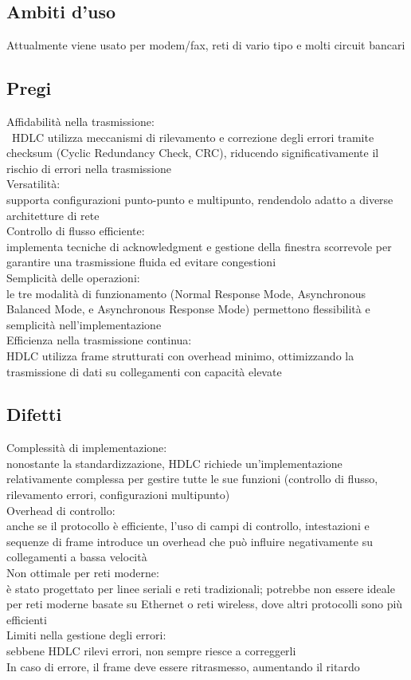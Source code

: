 \documentclass[10pt,oneside,a4paper]{article}
\begin{document}
\subsection{Ambiti d'uso}
Attualmente viene usato per modem/fax, reti di vario tipo e molti circuit bancari
\subsection{Pregi}
Affidabilità nella trasmissione:\\\
HDLC utilizza meccanismi di rilevamento e correzione degli errori tramite checksum (Cyclic Redundancy Check, CRC), riducendo significativamente il rischio di errori nella trasmissione\\
Versatilità:\\
supporta configurazioni punto-punto e multipunto, rendendolo adatto a diverse architetture di rete\\
Controllo di flusso efficiente:\\
implementa tecniche di acknowledgment e gestione della finestra scorrevole per garantire una trasmissione fluida ed evitare congestioni\\
Semplicità delle operazioni:\\
le tre modalità di funzionamento (Normal Response Mode, Asynchronous Balanced Mode, e Asynchronous Response Mode) permettono flessibilità e semplicità nell'implementazione\\
Efficienza nella trasmissione continua:\\
HDLC utilizza frame strutturati con overhead minimo, ottimizzando la trasmissione di dati su collegamenti con capacità elevate
\subsection{Difetti}
Complessità di implementazione:\\
nonostante la standardizzazione, HDLC richiede un'implementazione relativamente complessa per gestire tutte le sue funzioni (controllo di flusso, rilevamento errori, configurazioni multipunto)\\
Overhead di controllo:\\
anche se il protocollo è efficiente, l'uso di campi di controllo, intestazioni e sequenze di frame introduce un overhead che può influire negativamente su collegamenti a bassa velocità\\
Non ottimale per reti moderne:\\
è stato progettato per linee seriali e reti tradizionali; potrebbe non essere ideale per reti moderne basate su Ethernet o reti wireless, dove altri protocolli sono più efficienti\\
Limiti nella gestione degli errori:\\
sebbene HDLC rilevi errori, non sempre riesce a correggerli\\
In caso di errore, il frame deve essere ritrasmesso, aumentando il ritardo
\end{document}
